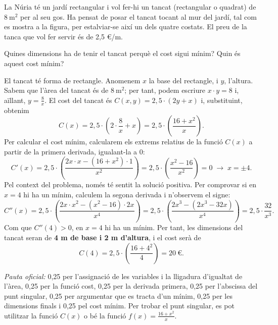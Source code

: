 La Núria té un jardí rectangular i vol fer-hi un tancat (rectangular o quadrat) de $8\ \text{m}^2$ per al seu gos. Ha pensat
de posar el tancat tocant al mur del jardí, tal com es mostra a la figura, per estalviar-se així un dels quatre costats.
El preu de la tanca que vol fer servir és de 2,5 €/m.
\begin{center}
\end{center}

\begin{apartats}

Quines dimensions ha de tenir el tancat perquè el cost sigui mínim? Quin és aquest cost mínim?

\begin{solucio}
El tancat té forma de rectangle. Anomenem $x$ la base del rectangle, i $y$, l'altura. Sabem que l'àrea del tancat és de
$8\ \text{m}^2$; per tant, podem escriure $x\cdot y=8$ i, aïllant, $y=\frac8x$. El cost del tancat és
$C(x,y)=2{,}5\cdot(2y+x)$ i, substituint, obtenim
\[
C(x)=2{,}5\cdot\left(2\cdot\frac8x+x\right)=2{,}5\cdot\left(\frac{16+x^2}{x}\right).
\]
Per calcular el cost mínim, calcularem els extrems relatius de la funció $C(x)$ a partir de la primera derivada,
igualant-la a 0:
\[
C'(x)=2{,}5\cdot\left(\frac{2x\cdot x-\left(16+x^2\right)\cdot1}{x^2}\right)=2{,}5\cdot\left(\frac{x^2-16}{x^2}\right)=0
\;\rightarrow\;x=\pm4 .
\]
Pel context del problema, només té sentit la solució positiva. Per comprovar si en $x=4$ hi ha un mínim, calculem la
segona derivada i n'observem el signe:
\[
C''(x)=2{,}5\cdot\left(\frac{2x\cdot x^2-\left(x^2-16\right)\cdot2x}{x^4}\right)
=2{,}5\cdot\left(\frac{2x^3-\left(2x^3-32x\right)}{x^4}\right)=2{,}5\cdot\frac{32}{x^3}.
\]
Com que $C''(4)>0$, en $x=4$ hi ha un mínim. Per tant, les dimensions del tancat seran de \textbf{4 m de base i 2 m
d'altura}, i el cost serà de
\[
C(4)=2{,}5\cdot\left(\frac{16+4^2}{4}\right)=\boxed{20\ \text{€}}.
\]

\textit{Pauta oficial:} 0,25 per l'assignació de les variables i la lligadura d'igualtat de l'àrea, 0,25 per la funció
cost, 0,25 per la derivada primera, 0,25 per l'abscissa del punt singular, 0,25 per argumentar que es tracta d'un
mínim, 0,25 per les dimensions finals i 0,25 pel cost mínim. Per trobar el punt singular, es pot utilitzar la funció
$C(x)$ o bé la funció $f(x)=\frac{16+x^2}{x}$.
\end{solucio}


\end{apartats}
